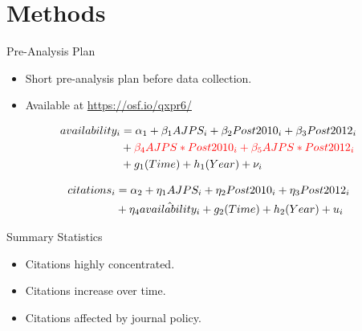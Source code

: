 \documentclass{beamer}
\begin{document}
\section{Methods}
\begin{frame}{Pre-Analysis Plan}

\begin{itemize}
\item Short pre-analysis plan before data collection.
\item Available at \url{https://osf.io/qxpr6/}
\end{itemize}

\begin{align}\label{firststage} 
availability_i &= \alpha_1 +\beta_1 AJPS_i + \beta_2 Post2010_i + \beta_3 Post2012_i \\ \notag
& + {\color{red} \beta_4 AJPS*Post2010_i + \beta_5 AJPS*Post2012_i } \\
& + g_1(Time) + h_1(Year) +\nu_i \notag
\end{align}

\begin{align}
citations_i &=\alpha_2 +\eta_1 AJPS_i + \eta_2 Post2010_i+ \eta_3 Post2012_i \\ 
& + \eta_4 \hat{availability_i}+g_2(Time) + h_2(Year) +u_i \notag
\end{align}

\end{frame}
\begin{frame}{Summary Statistics}
\begin{itemize}
\item Citations highly concentrated.
\item Citations increase over time.
\item Citations affected by journal policy.
\end{itemize}
\end{frame}
\end{document}
